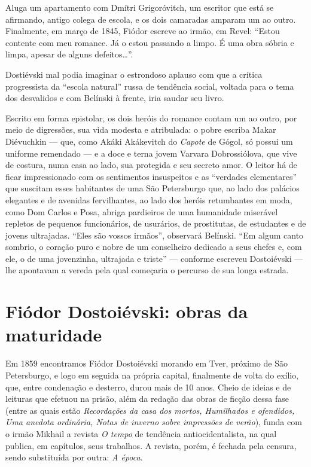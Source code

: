 Aluga um apartamento com Dmítri Grigoróvitch, um escritor que
está se afirmando, antigo colega de escola, e os dois camaradas
amparam um ao outro. Finalmente, em março de 1845, Fiódor escreve ao irmão, em
Revel: ``Estou contente com meu romance. Já o estou passando a limpo.
É uma obra sóbria e limpa, apesar de alguns defeitos\ldots{}''.

Dostiévski mal podia imaginar o estrondoso aplauso com que a
crítica progressista da ``escola natural'' russa de tendência
social, voltada para o tema dos desvalidos e com Belínski à
frente, iria saudar seu livro.

Escrito em forma epistolar, os dois heróis do romance contam um
ao outro, por meio de digressões, sua vida modesta e atribulada:
o pobre escriba Makar Diévuchkin --- que, como Akáki Akákevitch do
\emph{Capote} de Gógol, só possui um uniforme remendado --- e a
doce e terna jovem Varvara Dobrossiólova, que vive de costura,
numa casa ao lado, sua protegida e seu secreto amor. O
leitor há de ficar impressionado com os sentimentos insuspeitos
e as ``verdades elementares'' que suscitam esses habitantes de
uma São Petersburgo que, ao lado dos palácios elegantes e de
avenidas fervilhantes, ao lado dos heróis retumbantes em moda,
como Dom Carlos e Posa, abriga pardieiros de uma humanidade
miserável repletos de pequenos funcionários, de usurários, de
prostitutas, de estudantes e de jovens ultrajadas. ``Eles são
vossos irmãos'', observará Belínski. ``Em algum canto sombrio,
o coração puro e nobre de um conselheiro dedicado a seus chefes
e, com ele, o de uma jovenzinha, ultrajada e triste'' ---
conforme escreveu Dostoiévski --- lhe apontavam a vereda pela
qual começaria o percurso de sua longa estrada.


\section{\uppercase{F}iódor \uppercase{D}ostoiévski: obras da maturidade}


Em 1859 encontramos Fiódor Dostoiévski morando em Tver, próximo
de São Petersburgo, e logo em seguida na própria capital,
finalmente de volta do exílio, que, entre condenação e desterro,
durou mais de 10 anos. Cheio de ideias e de leituras que efetuou
na prisão, além da redação das obras de ficção dessa fase (entre
as quais estão \emph{Recordações da casa dos mortos, Humilhados
e ofendidos, Uma anedota ordinária, Notas de inverno sobre
impressões de verão}), funda com o irmão Mikhail a revista
\emph{O tempo} de tendência antiocidentalista, na qual publica,
em capítulos, seus trabalhos. A revista, porém, é fechada pela
censura, sendo substituída por outra: \emph{A época}.

